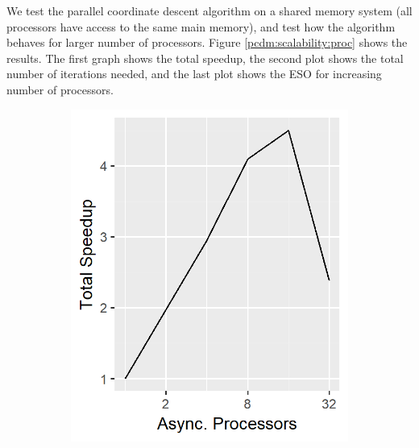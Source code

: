 We test the parallel coordinate descent algorithm on a shared memory system (all processors have access to the same main memory), and test how the algorithm behaves for larger number of processors. Figure \ref{pcdm:scalability:proc} shows the results. The first graph shows the total speedup, the second plot shows the total number of iterations needed, and the last plot shows the ESO for increasing number of processors.

\begin{figure}
	\centering
	\begin{subfigure}{0.30\linewidth}
		\includegraphics[width=1.0\linewidth]{./chapters/05.pcdm/scalability/speedup_pcdm_time.png}
	\end{subfigure}
	\begin{subfigure}{0.30\linewidth}

\end{subfigure}
\end{figure}
